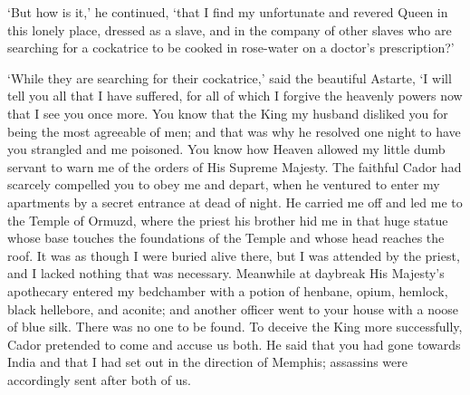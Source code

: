 \documentclass{article}
\begin{document}
\begin{center}
`But how is it,' he continued, `that I find my unfortunate and revered Queen in 
this lonely place, dressed as a slave, and in the company of other slaves who are 
searching for a cockatrice to be cooked in rose-water on a doctor's prescription?' 

`While they are searching for their cockatrice,' said the beautiful Astarte, `I 
will tell you all that I have suffered, for all of which I forgive the heavenly 
powers now that I see you once more. You know that the King my husband disliked 
you for being the most agreeable of men; and that was why he resolved one night 
to have you strangled and me poisoned. You know how Heaven allowed my little dumb 
servant to warn me of the orders of His Supreme Majesty. The faithful Cador had 
scarcely compelled you to obey me and depart, when he ventured to enter my apartments 
by a secret entrance at dead of night. He carried me off and led me to the Temple 
of Ormuzd, where the priest his brother hid me in that huge statue whose base touches 
the foundations of the Temple and whose head reaches the roof. It was as though 
I were buried alive there, but I was attended by the priest, and I lacked nothing 
that was necessary. Meanwhile at daybreak His Majesty's apothecary entered my bedchamber 
with a potion of henbane, opium, hemlock, black hellebore, and aconite; and another 
officer went to your house with a noose of blue silk. There was no one to be found. 
To deceive the King more successfully, Cador pretended to come and accuse us both. 
He said that you had gone towards India and that I had set out in the direction 
of Memphis; assassins were accordingly sent after both of us.


\end{center}
\end{document}
